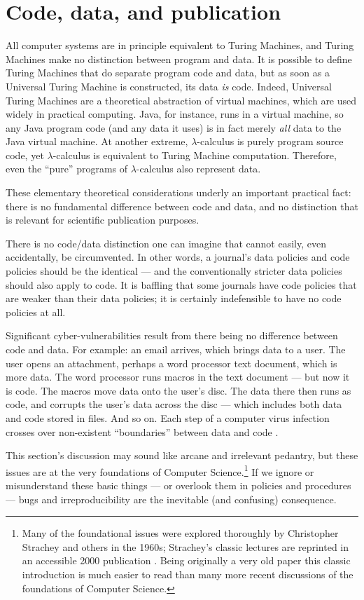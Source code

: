 \documentclass[10pt,a4paper]{article}
\begin{document}
\section{Code, data, and publication}
\label{supplement-on-code-data-publication}

All computer systems are in principle equivalent to Turing Machines, and Turing Machines make no distinction between program and data. It is possible to define Turing Machines that do separate program code and data, but as soon as a Universal Turing Machine is constructed, its data \emph{is\/} code. Indeed, Universal Turing Machines are a theoretical abstraction of virtual machines, which are used widely in practical computing. Java, for instance, runs in a virtual machine, so any Java program code (and any data it uses) is in fact merely \emph{all\/} data to the Java virtual machine. At another extreme, $\lambda$-calculus is purely program source code, yet $\lambda$-calculus is equivalent to Turing Machine computation. Therefore, even the ``pure'' programs of $\lambda$-calculus also represent data.

These elementary theoretical considerations underly an important practical fact: there is no fundamental difference between code and data, and no distinction that is relevant for scientific publication purposes. 

There is no code/data distinction one can imagine that cannot easily, even accidentally, be circumvented. In other words, a journal's data policies and code policies should be the identical --- and the conventionally stricter data policies should also apply to code. It is baffling that some journals have code policies that are weaker than their data policies; it is certainly indefensible to have no code policies at all.

{Significant cyber-vulnerabilities result from there being no difference between code and data. For example: an email arrives, which brings data to a user. The user opens an attachment, perhaps a word processor text document, which is more data. The word processor runs macros in the text document --- but now it is code. The macros move data onto the user's disc. The data there then runs as code, and corrupts the user's data across the disc --- which includes both data and code stored in files. And so on. Each step of a computer virus infection crosses over non-existent ``boundaries'' between data and code \cite{viruses}.}

This section's discussion may sound like arcane and irrelevant pedantry, but these issues are at the very foundations of Computer Science.\footnote{{Many of the foundational issues were explored thoroughly by Christopher Strachey and others in the 1960s; Strachey's classic lectures are reprinted in an accessible 2000 publication \cite{strachey}. Being originally a very old paper this classic introduction is much easier to read than many more recent discussions of the foundations of Computer Science.}} If we ignore or misunderstand these basic things --- or overlook them in policies and procedures --- bugs and irreproducibility are the inevitable (and confusing) consequence.
\end{document}
